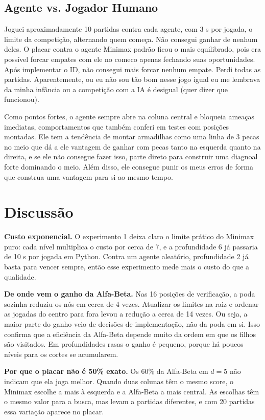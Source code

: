 \documentclass[letterpaper]{article} %
\begin{document}
\subsection{Agente vs. Jogador Humano}
Joguei aproximadamente 10 partidas contra cada agente, com 3 s por jogada, o limite da competição, alternando quem começa. Não consegui ganhar de nenhum deles. O placar contra o agente Minimax padrão ficou o mais equilibrado, pois era possível forcar empates com ele no comeco apenas fechando suas oportunidades. Após implementar o ID, não consegui mais forcar nenhum empate. Perdi todas as partidas. Aparentemente, ou eu não sou tão bom nesse jogo igual eu me lembrava da minha infância ou a competição com a IA é desigual (quer dizer que funcionou).

Como pontos fortes, o agente sempre abre na coluna central e bloqueia ameaças imediatas, comportamentos que também conferi em testes com posições montadas. Ele tem a tendência de montar armadilhas como uma linha de 3 pecas no meio que dá a ele vantagem de ganhar com pecas tanto na esquerda quanto na direita, e se ele não consegue fazer isso, parte direto para construir uma diagnoal forte dominando o meio. Além disso, ele consegue punir os meus erros de forma que construa uma vantagem para si ao mesmo tempo.

\section{Discussão}
\textbf{Custo exponencial.} O experimento 1 deixa claro o limite prático do Minimax puro: cada nível multiplica o custo por cerca de 7, e a profundidade 6 já passaria de 10 s por jogada em Python. Contra um agente aleatório, profundidade 2 já basta para vencer sempre, então esse experimento mede mais o custo do que a qualidade.

\textbf{De onde vem o ganho da Alfa-Beta.} Nas 16 posições de verificação, a poda sozinha reduziu os nós em cerca de 4 vezes. Atualizar os limites na raiz e ordenar as jogadas do centro para fora levou a redução a cerca de 14 vezes. Ou seja, a maior parte do ganho veio de decisões de implementação, não da poda em si. Isso confirma que a eficiência da Alfa-Beta depende muito da ordem em que os filhos são visitados. Em profundidades rasas o ganho é pequeno, porque há poucos níveis para os cortes se acumularem.

\textbf{Por que o placar não é 50\% exato.} Os 60\% da Alfa-Beta em $d=5$ não indicam que ela joga melhor. Quando duas colunas têm o mesmo score, o Minimax escolhe a mais à esquerda e a Alfa-Beta a mais central. As escolhas têm o mesmo valor para a busca, mas levam a partidas diferentes, e com 20 partidas essa variação aparece no placar.
\end{document}

